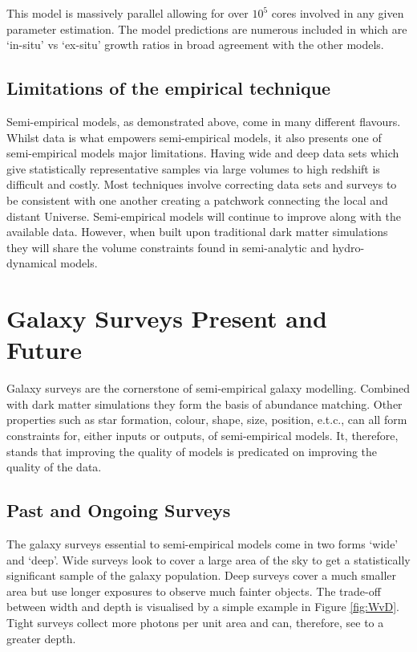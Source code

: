 This model is massively parallel allowing for over $10^{5}$ cores involved in any given parameter estimation. The model predictions are numerous included in which are `in-situ' vs `ex-situ' growth ratios in broad agreement with the other models.

\subsection{Limitations of the empirical technique}
Semi-empirical models, as demonstrated above, come in many different flavours. Whilst data is what empowers semi-empirical models, it also presents one of semi-empirical models major limitations. Having wide and deep data sets which give statistically representative samples via large volumes to high redshift is difficult and costly. Most techniques involve correcting data sets and surveys to be consistent with one another creating a patchwork connecting the local and distant Universe. Semi-empirical models will continue to improve along with the available data. However, when built upon traditional dark matter simulations they will share the volume constraints found in semi-analytic and hydro-dynamical models.


\section{Galaxy Surveys Present and Future}
\label{sec:Surveys}
Galaxy surveys are the cornerstone of semi-empirical galaxy modelling. Combined with dark matter simulations they form the basis of abundance matching. Other properties such as star formation, colour, shape, size, position, e.t.c., can all form constraints for, either inputs or outputs, of semi-empirical models. It, therefore, stands that improving the quality of models is predicated on improving the quality of the data.

\subsection{Past and Ongoing Surveys}
The galaxy surveys essential to semi-empirical models come in two forms `wide' and `deep'. Wide surveys look to cover a large area of the sky to get a statistically significant sample of the galaxy population. Deep surveys cover a much smaller area but use longer exposures to observe much fainter objects. The trade-off between width and depth is visualised by a simple example in Figure \ref{fig:WvD}. Tight surveys collect more photons per unit area and can, therefore, see to a greater depth.

